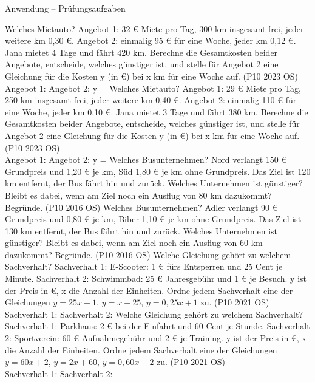 \begin{aufgabe}{Anwendung – Prüfungsaufgaben}
\begin{teile}
\steil Welches Mietauto? Angebot 1: 32 € Miete pro Tag, 300 km insgesamt frei, jeder weitere km 0{,}30 €. Angebot 2: einmalig 95 € für eine Woche, jeder km 0{,}12 €. Jana mietet 4 Tage und fährt 420 km. Berechne die Gesamtkosten beider Angebote, entscheide, welches günstiger ist, und stelle für Angebot 2 eine Gleichung für die Kosten y (in €) bei x km für eine Woche auf. \hfill (P10 2023 OS) \\ Angebot 1: \leerfeld[€] \quad Angebot 2: \leerfeld[€] \quad y = \leerfeld
\steil Welches Mietauto? Angebot 1: 29 € Miete pro Tag, 250 km insgesamt frei, jeder weitere km 0{,}40 €. Angebot 2: einmalig 110 € für eine Woche, jeder km 0{,}10 €. Jana mietet 3 Tage und fährt 380 km. Berechne die Gesamtkosten beider Angebote, entscheide, welches günstiger ist, und stelle für Angebot 2 eine Gleichung für die Kosten y (in €) bei x km für eine Woche auf. \hfill (P10 2023 OS) \\ Angebot 1: \leerfeld[€] \quad Angebot 2: \leerfeld[€] \quad y = \leerfeld
\teil Welches Busunternehmen? Nord verlangt 150 € Grundpreis und 1{,}20 € je km, Süd 1{,}80 € je km ohne Grundpreis. Das Ziel ist 120 km entfernt, der Bus fährt hin und zurück. Welches Unternehmen ist günstiger? Bleibt es dabei, wenn am Ziel noch ein Ausflug von 80 km dazukommt? Begründe. \hfill (P10 2016 OS)
\teil Welches Busunternehmen? Adler verlangt 90 € Grundpreis und 0{,}80 € je km, Biber 1{,}10 € je km ohne Grundpreis. Das Ziel ist 130 km entfernt, der Bus fährt hin und zurück. Welches Unternehmen ist günstiger? Bleibt es dabei, wenn am Ziel noch ein Ausflug von 60 km dazukommt? Begründe. \hfill (P10 2016 OS)
\teil Welche Gleichung gehört zu welchem Sachverhalt? Sachverhalt 1: E-Scooter: 1 € fürs Entsperren und 25 Cent je Minute. Sachverhalt 2: Schwimmbad: 25 € Jahresgebühr und 1 € je Besuch. y ist der Preis in €, x die Anzahl der Einheiten. Ordne jedem Sachverhalt eine der Gleichungen $y = 25x + 1$, $y = x + 25$, $y = 0{,}25x + 1$ zu. \hfill (P10 2021 OS) \\ Sachverhalt 1: \leerfeld \quad Sachverhalt 2: \leerfeld
\teil Welche Gleichung gehört zu welchem Sachverhalt? Sachverhalt 1: Parkhaus: 2 € bei der Einfahrt und 60 Cent je Stunde. Sachverhalt 2: Sportverein: 60 € Aufnahmegebühr und 2 € je Training. y ist der Preis in €, x die Anzahl der Einheiten. Ordne jedem Sachverhalt eine der Gleichungen $y = 60x + 2$, $y = 2x + 60$, $y = 0{,}60x + 2$ zu. \hfill (P10 2021 OS) \\ Sachverhalt 1: \leerfeld \quad Sachverhalt 2: \leerfeld

\end{teile}
\end{aufgabe}
